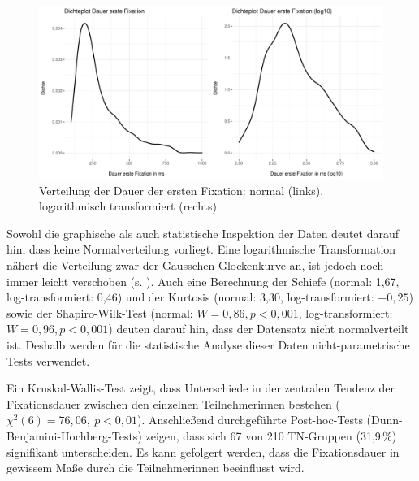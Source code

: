 \begin{figure}[p]
    \includegraphics[width=\textwidth]{Figures/EyeTracking/CatDe/ggplot_CatDe-FFDur_density_de}
	\caption{Verteilung der Dauer der ersten Fixation: normal (links), logarithmisch transformiert (rechts)}
	\label{K6:fig:CatDe:density-ffdur}
\end{figure}



Sowohl die graphische als auch statistische Inspektion der Daten deutet darauf hin, dass keine Normalverteilung vorliegt. Eine logarithmische Transformation nähert die Verteilung zwar der Gausschen Glockenkurve an, ist jedoch noch immer leicht verschoben (s. ). Auch eine Berechnung der Schiefe (normal: 1,67, log-trans\-for\-miert: 0,46) und der Kurtosis (normal: 3,30, log-trans\-for\-miert: $-0,25$) sowie der Shapiro-Wilk-Test (normal: $W = 0,86, p < 0,001$, log-trans\-for\-miert: $W = 0,96, p < 0,001$) deuten darauf hin, dass der Datensatz nicht normalverteilt ist. Deshalb werden für die statistische Analyse dieser Daten nicht-parametrische Tests verwendet.

\begin{sloppypar}
Ein Kruskal-Wallis-Test zeigt, dass Unterschiede in der zentralen Tendenz der Fixationsdauer zwischen den einzelnen Teilnehmer{\textperiodcentered}innen bestehen ($\chi^2(6) = 76,06,\allowbreak\ p < 0,01$). Anschließend durchgeführte Post-hoc-Tests (Dunn-Ben\-ja\-mi\-ni-Hoch\-berg-Tests) zeigen, dass sich 67 von 210 TN-Gruppen (31,9\,\%) signifikant unterscheiden. Es kann gefolgert werden, dass die Fixationsdauer in gewissem Maße durch die Teilnehmer{\textperiodcentered}innen beeinflusst wird.
\end{sloppypar}


